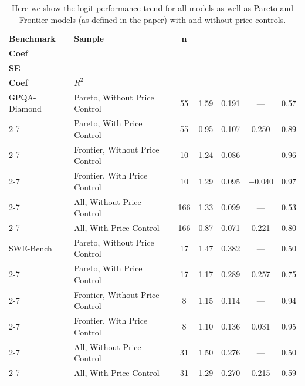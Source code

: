 \renewcommand{\arraystretch}{1.2}

\begin{table}[t]
\centering
\caption{Here we show the logit performance trend for all models as well as Pareto and Frontier models (as defined in the paper) with and without price controls.}
\label{tab:multi_benchmark_regression_rounded}
\renewcommand{\arraystretch}{1.2}

\begin{tabular}{|l|l|c|c|c|c|c|}
\hline
\textbf{Benchmark} &
\textbf{Sample} &
\textbf{n} &
\shortstack{\textbf{Time}\\\textbf{Coef}} &
\shortstack{\textbf{Time}\\\textbf{SE}} &
\shortstack{\textbf{Price}\\\textbf{Coef}} &
\textbf{$R^2$} \\
\hline

GPQA-Diamond & Pareto, Without Price Control & 55 & 1.59 & 0.191 & --- & 0.57 \\ \cline{2-7}
\rowcolor{restrgray} \cellcolor{white} & Pareto, With Price Control & 55 & 0.95 & 0.107 & 0.250 & 0.89 \\ \cline{2-7}
\cellcolor{white} & Frontier, Without Price Control & 10 & 1.24 & 0.086 & --- & 0.96 \\ \cline{2-7}
\rowcolor{restrgray} \cellcolor{white} & Frontier, With Price Control & 10 & 1.29 & 0.095 & $-0.040$ & 0.97 \\ \cline{2-7}
\cellcolor{white} & All, Without Price Control & 166 & 1.33 & 0.099 & --- & 0.53 \\ \cline{2-7}
\rowcolor{restrgray} \cellcolor{white} & All, With Price Control & 166 & 0.87 & 0.071 & 0.221 & 0.80 \\
\hline

SWE-Bench & Pareto, Without Price Control & 17 & 1.47 & 0.382 & --- & 0.50 \\ \cline{2-7}
\rowcolor{restrgray} \cellcolor{white} & Pareto, With Price Control & 17 & 1.17 & 0.289 & 0.257 & 0.75 \\ \cline{2-7}
\cellcolor{white} & Frontier, Without Price Control & 8 & 1.15 & 0.114 & --- & 0.94 \\ \cline{2-7}
\rowcolor{restrgray} \cellcolor{white} & Frontier, With Price Control & 8 & 1.10 & 0.136 & 0.031 & 0.95 \\ \cline{2-7}
\cellcolor{white} & All, Without Price Control & 31 & 1.50 & 0.276 & --- & 0.50 \\ \cline{2-7}
\rowcolor{restrgray} \cellcolor{white} & All, With Price Control & 31 & 1.29 & 0.270 & 0.215 & 0.59 \\
\hline


\end{tabular}
\end{table}

